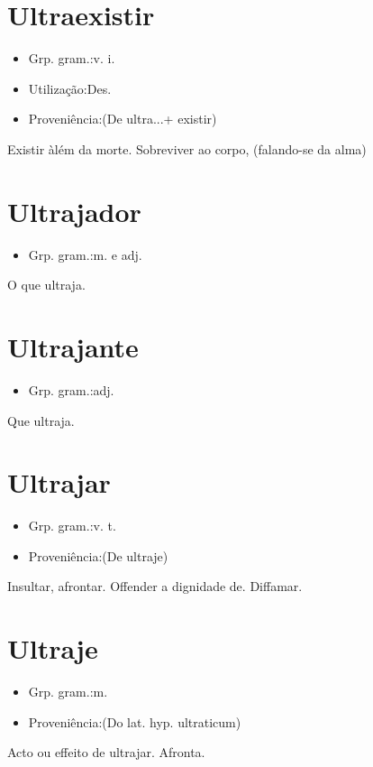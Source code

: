 \documentclass{article}
\begin{document}
\section{Ultraexistir}
\begin{itemize}
\item {Grp. gram.:v. i.}
\end{itemize}
\begin{itemize}
\item {Utilização:Des.}
\end{itemize}
\begin{itemize}
\item {Proveniência:(De \textunderscore ultra...\textunderscore  + \textunderscore existir\textunderscore )}
\end{itemize}
Existir àlém da morte.
Sobreviver ao corpo, (falando-se da alma)
\section{Ultrajador}
\begin{itemize}
\item {Grp. gram.:m.  e  adj.}
\end{itemize}
O que ultraja.
\section{Ultrajante}
\begin{itemize}
\item {Grp. gram.:adj.}
\end{itemize}
Que ultraja.
\section{Ultrajar}
\begin{itemize}
\item {Grp. gram.:v. t.}
\end{itemize}
\begin{itemize}
\item {Proveniência:(De \textunderscore ultraje\textunderscore )}
\end{itemize}
Insultar, afrontar.
Offender a dignidade de.
Diffamar.
\section{Ultraje}
\begin{itemize}
\item {Grp. gram.:m.}
\end{itemize}
\begin{itemize}
\item {Proveniência:(Do lat. hyp. \textunderscore ultraticum\textunderscore )}
\end{itemize}
Acto ou effeito de ultrajar.
Afronta.
\end{document}
